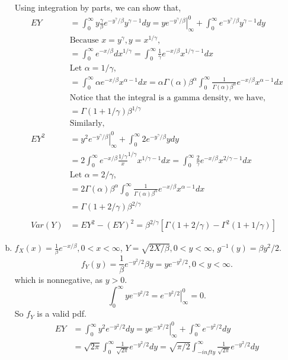 \documentclass[letterpaper]{article}
\newcommand{\sqtpi}{\sqrt{2\pi}}
\newcommand{\intzi}{\int_0^\infty}
\begin{document}
\begin{enumerate}[(a)]
    Using integration by parts, we can show that,
    \begin{align*}
    EY & = \intzi y \frac{\gamma}{\beta} e^{-y^\gamma/\beta} y^{\gamma-1} dy = \left. y e^{-y^\gamma/\beta} \right|^0_\infty + \intzi e^{-y^\gamma/\beta} y^{\gamma-1} dy \\
    & \text{Because $x = y^\gamma, y = x^{1/\gamma}$},\\
    & = \intzi e^{-x/\beta} dx^{1/\gamma} = \intzi \frac{1}{\gamma} e^{-x/\beta} x^{1/\gamma -1} dx \\
    & \text{Let $\alpha = 1/\gamma$},\\
    & = \intzi \alpha e^{-x/\beta}  x^{\alpha-1} dx = \alpha \Gamma(\alpha) \beta^\alpha \intzi \frac{1}{\Gamma(\alpha)\beta^\alpha} e^{-x/\beta} x^{\alpha-1}dx \\
    & \text{Notice that the integral is a gamma density, we have},\\
    & = \Gamma(1 + 1/\gamma) \beta^{1/\gamma}\\
    & \text{Similarly},\\
    EY^2 & = \left. y^2 e^{-y^\gamma/\beta} \right|^0_\infty + \intzi 2e^{-y^\gamma/\beta} y dy \\
    & = 2 \intzi e^{-x/\beta} \frac{1/\gamma} x^{1/\gamma} x^{1/\gamma-1} dx = \intzi \frac{2}{\gamma} e^{-x/\beta} x^{2/\gamma -1} dx \\
    & \text{Let $\alpha= 2/\gamma$},\\
    & = 2\Gamma(\alpha) \beta^\alpha \intzi \frac{1}{\Gamma(\alpha)\beta^\alpha} e^{-x/\beta} x^{\alpha-1} dx \\
    & = \Gamma(1+2/\gamma) \beta^{2/\gamma}\\
    \\
    Var(Y) & = EY^2 - (EY)^2 = \beta^{2/\gamma}\left[\Gamma(1+2/\gamma) - \Gamma^2(1+1/\gamma)\right]
    \end{align*}
    \item $f_X(x) = \frac{1}{\beta} e^{-x/\beta}, 0 < x < \infty$, $Y=\sqrt{2X/\beta}, 0 < y < \infty$, $g^{-1}(y) = \beta y^2/2$. 
    \[
    f_Y(y) = \frac{1}{\beta} e^{-y^2/2}\beta y = y e^{-y^2/2}, 0 < y < \infty.
    \]
    which is nonnegative, as $y > 0$.
    \[
    \intzi ye^{-y^2/2} = \left. e^{-y^2/2} \right|^0_\infty = 0.
    \]
    So $f_Y$ is a valid pdf.
    \begin{align*}
    EY & = \intzi y^2 e^{-y^2/2}dy = \left.y e^{-y^2/2}\right|^0_\infty + \intzi e^{-y^2/2}dy \\
    & = \sqtpi \intzi \frac{1}{\sqtpi} e^{-y^2/2}dy = \sqrt{\pi/2} \int_{-infty}^\infty \frac{1}{\sqtpi} e^{-y^2/2}dy \\

\end{align*}
\end{enumerate}
\end{document}
